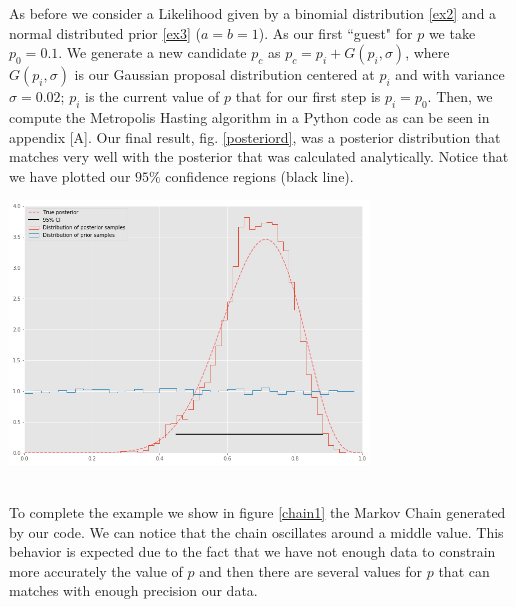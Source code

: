 \documentclass[onecolumn,           %
               showpacs,            %
               preprintnumbers,     %
               aps,                 %
               prl,          	    %
               letterpaper,             %
               superscriptaddress,      %
               nofootinbib,         %
               tightenlines,        %
               floats,floatfix      %
               ,usenatbib,
               ]{revtex4-1}
\begin{document}
As before we consider a Likelihood given by a binomial distribution \eqref{ex2} and a normal distributed prior \eqref{ex3} ($a=b=1$). As our first ``guest" for $p$ we take $p_0=0.1$. We generate a new candidate $p_c$ as $p_c=p_i+G(p_i,\sigma)$, where $G(p_i,\sigma)$ is our Gaussian proposal distribution centered at $p_i$ and with variance $\sigma=0.02$; $p_i$ is the current value of $p$ that for our first step is $p_i=p_0$. Then, we compute the Metropolis Hasting algorithm in a Python code as can be seen in appendix [A]. Our final result,  fig. \ref{posteriord}, was a posterior distribution that matches very well with the posterior that was calculated analytically. Notice that we have plotted our $95\%$ confidence regions (black line). 

\begin{minipage}{\textwidth}
\centering
\includegraphics[height=7cm]{posterior.png}
\label{posteriord}
\end{minipage}\\

To complete the example we show in figure \ref{chain1} the Markov Chain generated by our code. We can notice that the chain oscillates around a middle value. This behavior is expected due to the fact that we have not enough data to constrain more accurately the value of $p$ and then there are several values for $p$ that can matches with enough precision our data.   
\end{document}
